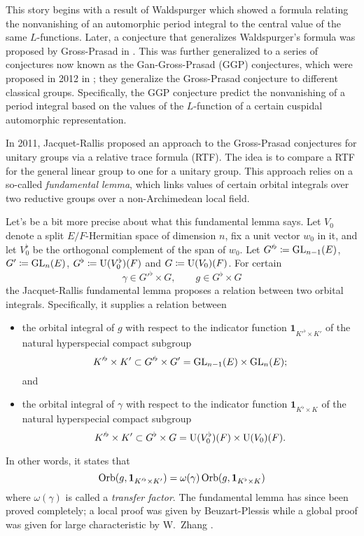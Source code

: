 This story begins with a result of
Waldspurger \cite{ref:waldspurger} which showed a formula
relating the nonvanishing of an automorphic period integral
to the central value of the same $L$-functions.
Later, a conjecture that generalizes Waldspurger's formula
was proposed by Gross-Prasad in \cite{ref:GP1,ref:GP2}.
This was further generalized to a series of conjectures
now known as the Gan-Gross-Prasad (GGP) conjectures,
which were proposed in 2012 in \cite{ref:GGP};
they generalize the Gross-Prasad conjecture to different classical groups.
Specifically, the GGP conjecture predict the nonvanishing of a period integral
based on the values of the $L$-function of a certain cuspidal automorphic representation.

In 2011, Jacquet-Rallis \cite{ref:JR} proposed an approach to the Gross-Prasad conjectures
for unitary groups via a relative trace formula (RTF).
The idea is to compare a RTF for the general linear group to one for a unitary group.
This approach relies on a so-called \emph{fundamental lemma},
which links values of certain orbital integrals
over two reductive groups over a non-Archimedean local field.

Let's be a bit more precise about what this fundamental lemma says.
Let $V_0$ denote a split $E/F$-Hermitian space of dimension $n$,
fix a unit vector $w_0$ in it,
and let $V_0^\flat$ be the orthogonal complement of the span of $w_0$.
Let $G'^\flat \coloneqq \operatorname{GL}_{n-1}(E)$, $G' \coloneqq \operatorname{GL}_n(E)$,
$G^\flat \coloneqq \operatorname{U}(V_0^\flat)(F)$ and $G \coloneqq \operatorname{U}(V_0)(F)$.
For certain
\[ \gamma \in G'^\flat \times G, \qquad g \in G^\flat \times G \]
the Jacquet-Rallis fundamental lemma proposes a relation between two orbital integrals.
Specifically, it supplies a relation between
\begin{itemize}
\item the orbital integral of $g$ with respect to
  the indicator function $\mathbf{1}_{K'^\flat \times K'}$
  of the natural hyperspecial compact subgroup
  \[ K'^\flat \times K' \subset G'^\flat \times G' = \operatorname{GL}_{n-1}(E) \times \operatorname{GL}_n(E); \]
  and
\item the orbital integral of $\gamma$ with respect to
  the indicator function $\mathbf{1}_{K^\flat \times K}$
  of the natural hyperspecial compact subgroup
  \[ K'^\flat \times K' \subset G^\flat \times G = \operatorname{U}(V_0^\flat)(F) \times \operatorname{U}(V_0)(F). \]
\end{itemize}
In other words, it states that
\begin{equation}
  \operatorname{Orb}(g, \mathbf{1}_{K'^\flat \times K'}) = \omega(\gamma) \operatorname{Orb}(g, \mathbf{1}_{K^\flat \times K})
  \label{eq:old_FL}
\end{equation}
where $\omega(\gamma)$ is called a \emph{transfer factor}.
The fundamental lemma has since been proved completely;
a local proof was given by Beuzart-Plessis \cite{ref:BeuzartPlessis}
while a global proof was given for large characteristic by W.\ Zhang \cite{ref:Wei2021}.

